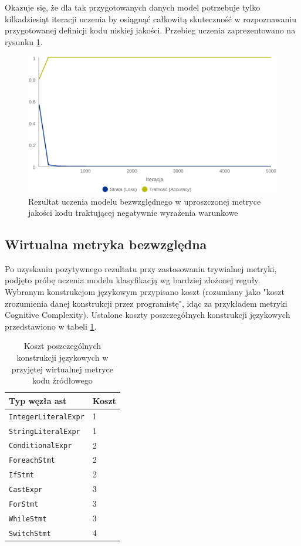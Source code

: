 \documentclass[12pt]{report}
\begin{document}
Okazuje się, że dla tak przygotowanych danych model potrzebuje tylko kilkadziesiąt iteracji uczenia by osiągnąć całkowitą skuteczność w rozpoznawaniu przygotowanej definicji kodu niskiej jakości. Przebieg uczenia zaprezentowano na rysunku \ref{fig:learn:fake-ifs}.

\begin{figure}
\centering
\includegraphics[width=\textwidth]{learn/fake-ifs.eps}
\caption{Rezultat uczenia modelu bezwzględnego w uproszczonej metryce jakości kodu traktującej negatywnie wyrażenia warunkowe}
\label{fig:learn:fake-ifs}
\end{figure}

\subsection{Wirtualna metryka bezwzględna}
\label{sec:learn:fake-static7}
Po uzyskaniu pozytywnego rezultatu przy zastosowaniu trywialnej metryki, podjęto próbę uczenia modelu klasyfikacją wg bardziej złożonej reguły. Wybranym konstrukcjom językowym przypisano koszt (rozumiany jako "koszt zrozumienia danej konstrukcji przez programistę", idąc za przykładem metryki Cognitive Complexity\cite{cognitive}). Ustalone koszty poszczegółnych konstrukcji językowych przedstawiono w tabeli \ref{tbl:learn:fake-cost}.

\begin{table}[t]
\caption{Koszt poszczególnych konstrukcji językowych w przyjętej wirtualnej metryce kodu źródłowego}
\label{tbl:learn:fake-cost}
\begin{tabular}{|l|l|}
  \hline 
  \textbf{Typ węzła \gls{ast}} & \textbf{Koszt} \\ \hline
  \texttt{IntegerLiteralExpr} & 1 \\ \hline
  \texttt{StringLiteralExpr} & 1 \\ \hline
  \texttt{ConditionalExpr} & 2 \\ \hline
  \texttt{ForeachStmt} & 2 \\ \hline
  \texttt{IfStmt} & 2 \\ \hline
  \texttt{CastExpr} & 3 \\ \hline
  \texttt{ForStmt} & 3 \\ \hline
  \texttt{WhileStmt} & 3 \\ \hline
  \texttt{SwitchStmt} & 4 \\ \hline
\end{tabular} 
\end{table}
\end{document}
